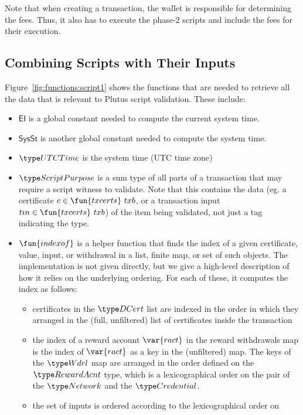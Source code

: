 Note that when creating a transaction, the wallet is responsible for
determining the fees. Thus, it also has to execute the phase-2 scripts
and include the fees for their execution.

\subsection{Combining Scripts with Their Inputs}
\label{sec:scripts-inputs}

Figure~\ref{fig:functions:script1} shows the functions that are needed to
retrieve all the data that is relevant to Plutus script validation.
These include:

\begin{itemize}
\item $\mathsf{EI}$ is a global constant needed to compute the current system time.
\item $\mathsf{SysSt}$ is another global constant needed to compute the system time.
\item $\UTCTime$ is the system time (UTC time zone)
\item
  $\ScriptPurpose$ is a sum type of all parts of a transaction that may
  require a script witness to validate. Note that this contains the data
  (eg. a certificate $c \in \fun{txcerts}~{txb}$,
  or a transaction input $tin \in \fun{txcerts}~{txb}$) of the item being validated,
  not just a tag indicating the type.
\item
  $\fun{indexof}$ is a helper function that finds the index of a given certificate, value, input, or
  withdrawal in a list, finite map, or set of such objects. The implementation is not given
  directly, but we give a high-level description of how it relies on the underlying ordering.
  For each of these, it computes the index as follows:
  \begin{itemize}
    \item certificates in the $\DCert$ list are indexed in the order in which they arranged
    in the (full, unfiltered) list of certificates inside the transaction
    \item the index of a reward account $\var{ract}$ in the reward withdrawals map is
    the index of $\var{ract}$ as a key in the (unfiltered) map. The keys of the $\Wdrl$
    map are arranged in the order defined on the $\RewardAcnt$ type, which is a lexicographical
    order on the pair of the $\Network$ and the $\Credential$.
    \item the set of inputs is ordered according to the lexicographical order on

\end{itemize}
\end{itemize}
